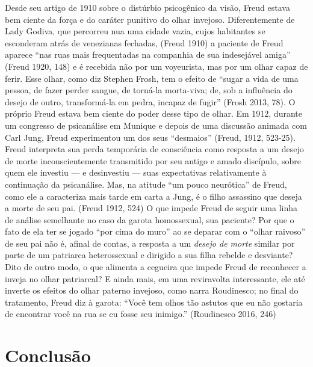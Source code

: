 Desde seu artigo de 1910 sobre o distúrbio psicogênico da visão, Freud
estava bem ciente da força e do caráter punitivo do olhar invejoso.
Diferentemente de Lady Godiva, que percorreu nua uma cidade vazia, cujos
habitantes se esconderam atrás de venezianas fechadas, (Freud 1910) a
paciente de Freud aparece ``nas ruas mais frequentadas na companhia de
sua indesejável amiga'' (Freud 1920, 148) e é recebida não por um
voyeurista, mas por um olhar capaz de ferir. Esse olhar, como diz
Stephen Frosh, tem o efeito de ``sugar a vida de uma pessoa, de fazer
perder sangue, de torná-la morta-viva; de, sob a influência do desejo de
outro, transformá-la em pedra, incapaz de fugir'' (Frosh 2013, 78). O
próprio Freud estava bem ciente do poder desse tipo de olhar. Em 1912,
durante um congresso de psicanálise em Munique e depois de uma discussão
animada com Carl Jung, Freud experimentou um dos seus ``desmaios'' (Freud,
1912, 523-25). Freud interpreta sua perda temporária de consciência como
resposta a um desejo de morte inconscientemente transmitido por seu
antigo e amado discípulo, sobre quem ele investiu --- e desinvestiu ---
suas expectativas relativamente à continuação da psicanálise. Mas, na
atitude ``um pouco neurótica'' de Freud, como ele a caracteriza mais tarde
em carta a Jung, é o filho assassino que deseja a morte de seu pai.
(Freud 1912, 524) O que impede Freud de seguir uma linha de análise
semelhante no caso da garota homossexual, sua paciente? Por que o fato
de ela ter se jogado ``por cima do muro'' ao se deparar com o ``olhar
raivoso'' de seu pai não é, afinal de contas, a resposta a um
\emph{desejo de morte} similar por parte de um patriarca heterossexual e
dirigido a sua filha rebelde e desviante? Dito de outro modo, o que
alimenta a cegueira que impede Freud de reconhecer a inveja no olhar
patriarcal? E ainda mais, em uma reviravolta interessante, ele até
inverte os efeitos do olhar paterno invejoso, como narra Roudinesco; no
final do tratamento, Freud diz à garota: ``Você tem olhos tão astutos
que eu não gostaria de encontrar você na rua se eu fosse seu inimigo.''
(Roudinesco 2016, 246)

\section{Conclusão}

